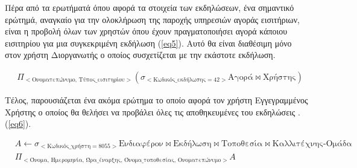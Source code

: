 Πέρα από τα ερωτήματά όπου αφορά τα στοιχεία των εκδηλώσεων, ένα
σημαντικό ερώτημά, αναγκαίο για την ολοκλήρωση της παροχής υπηρεσιών
αγοράς εισιτήριων, είναι η προβολή όλων των χρηστών όπου έχουν
πραγματοποιήσει αγορά κάποιου εισιτηρίου για μια συγκεκριμένη εκδήλωση
(\ref{eq5}). Αυτό θα είναι διαθέσιμη μόνο στον χρήστη Διοργανωτής ο
οποίος συσχετίζεται με την εκάστοτε εκδήλωση.

\begin{equation}
  \label{eq5}
  \begin{split}
    &\Pi_{<\text{Ονοματεπώνυμο, Τύπος\_εισιτηρίου}>}(
    \sigma_{<\text{Κωδικός\_εκδήλωσης} = 42>} \text{Αγορά} \bowtie
    \text{Χρήστης})
  \end{split}
\end{equation}

Τέλος, παρουσιάζεται ένα ακόμα ερώτημα το οποίο αφορά τον χρήστη
Εγγεγραμμένος Χρήστης ο οποίος θα θελήσει να προβάλει όλες τις
αποθηκευμένες του εκδηλώσεις . (\ref{eq6}).


\begin{equation}
  \label{eq6}
  \begin{split}
    &A \leftarrow \sigma_{<\text{Κωδικός\_χρήστη} = 8055>}
    \text{Ενδιαφέρον} \bowtie \text{Εκδήλωση} \bowtie \text{Τοποθεσία}
    \bowtie \text{Καλλιτέχνης-Ομάδα} \\
    &\Pi_{<\text{Όνομα, Ημερομηνία, Ώρα\_έναρξης, Όνομα\_τοποθεσίας,
        Ονοματεπώνυμο}>}A
  \end{split}
\end{equation}










